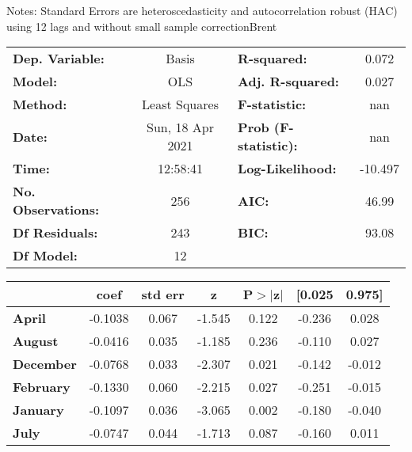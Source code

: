 Notes: \newline
 [1] Standard Errors are heteroscedasticity and autocorrelation robust (HAC) using 12 lags and without small sample correctionBrent\begin{center}
\begin{tabular}{lclc}
\toprule
\textbf{Dep. Variable:}    &      Basis       & \textbf{  R-squared:         } &     0.072   \\
\textbf{Model:}            &       OLS        & \textbf{  Adj. R-squared:    } &     0.027   \\
\textbf{Method:}           &  Least Squares   & \textbf{  F-statistic:       } &       nan   \\
\textbf{Date:}             & Sun, 18 Apr 2021 & \textbf{  Prob (F-statistic):} &      nan    \\
\textbf{Time:}             &     12:58:41     & \textbf{  Log-Likelihood:    } &   -10.497   \\
\textbf{No. Observations:} &         256      & \textbf{  AIC:               } &     46.99   \\
\textbf{Df Residuals:}     &         243      & \textbf{  BIC:               } &     93.08   \\
\textbf{Df Model:}         &          12      & \textbf{                     } &             \\
\bottomrule
\end{tabular}
\begin{tabular}{lcccccc}
                   & \textbf{coef} & \textbf{std err} & \textbf{z} & \textbf{P$> |$z$|$} & \textbf{[0.025} & \textbf{0.975]}  \\
\midrule
\textbf{April}     &      -0.1038  &        0.067     &    -1.545  &         0.122        &       -0.236    &        0.028     \\
\textbf{August}    &      -0.0416  &        0.035     &    -1.185  &         0.236        &       -0.110    &        0.027     \\
\textbf{December}  &      -0.0768  &        0.033     &    -2.307  &         0.021        &       -0.142    &       -0.012     \\
\textbf{February}  &      -0.1330  &        0.060     &    -2.215  &         0.027        &       -0.251    &       -0.015     \\
\textbf{January}   &      -0.1097  &        0.036     &    -3.065  &         0.002        &       -0.180    &       -0.040     \\
\textbf{July}      &      -0.0747  &        0.044     &    -1.713  &         0.087        &       -0.160    &        0.011     \\

\end{tabular}
\end{center}
